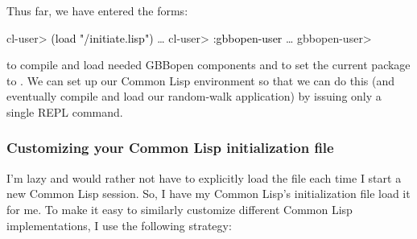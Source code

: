 \documentclass[10pt,twoside,english,pdftex]{article}
\begin{document}
Thus far, we have entered the forms:
%
\W\supp
\begin{example}
\textcolor{darkergray}{%
  cl-user> \textcolor{black}{(load "/initiate.lisp")}
     \textrm{\ldots{}}
  cl-user> \textcolor{black}{:gbbopen-user}
     \textrm{\ldots{}}
  gbbopen-user>}
\end{example}
%
to compile and load needed GBBopen components and to set the current package
to .  We can set up our Common Lisp environment so
that we can do this (and eventually compile and load our random-walk
application) by issuing only a single REPL command.

\subsubsection*{Customizing your Common Lisp initialization file}

I'm lazy and would rather not have to explicitly load the
 file each time I start a new
Common Lisp session.  So, I have my Common Lisp's initialization file load it
for me.  To make it easy to similarly customize different Common Lisp
implementations, I use the following strategy:
\end{document}
